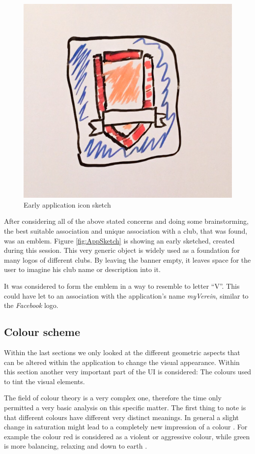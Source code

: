 \begin{figure}[h]
  	\centering
  	\includegraphics[width=0.5\linewidth]{./images/app-sketch.jpg}
  	\caption[Early application icon sketch, own figure]{Early application icon sketch}
	\label{fig:AppSketch}
\end{figure}

After considering all of the above stated concerns and doing some brainstorming, the best suitable association and unique association with a club, that was found, was an emblem. Figure \vref{fig:AppSketch} is showing an early sketched, created during this session. This very generic object is widely used as a foundation for many logos of different clubs. By leaving the banner empty, it leaves space for the user to imagine his club name or description into it. 

It was considered to form the emblem in a way to resemble to letter \enquote{V}. This could have let to an association with the application's name \emph{myVerein}, similar to the \emph{Facebook} logo. 

\subsection{Colour scheme}

Within the last sections we only looked at the different geometric aspects that can be altered within the application to change the visual appearance. Within this section another very important part of the \acrshort{UI} is considered: The colours used to tint the visual elements. 

The field of colour theory is a very complex one, therefore the time only permitted a very basic analysis on this specific matter. The first thing to note is that different colours have different very distinct meanings. In general a slight change in saturation might lead to a completely new impression of a colour \cite{Chapman:2010aa}. For example the colour red is considered as a violent or aggressive colour, while green is more balancing, relaxing and down to earth \cite{Chapman:2010aa}.

